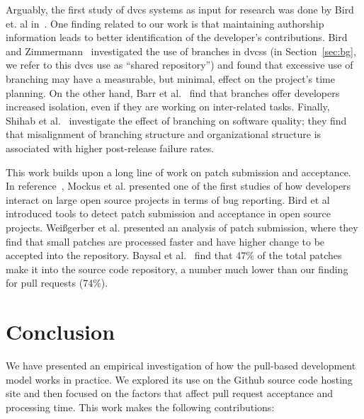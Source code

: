 \documentclass{acm_proc_article-sp}
\begin{document}
Arguably, the first study of {\sc dvcs} systems as input for research was done
by Bird et. al in~\cite{Bird09}. One finding related to our work is that
maintaining authorship information leads to better identification of the
developer's contributions. Bird and Zimmermann~\cite{Bird12} investigated the
use of branches in {\sc dvcs}s (in Section~\ref{sec:bg}, we refer to this {\sc
dvcs} use as ``shared repository'') and found that excessive use of branching
may have a measurable, but minimal, effect on the project's time planning.
On the other hand, Barr et al.~\cite{Barr12} find that branches offer developers
increased isolation, even if they are working on inter-related tasks.
Finally, Shihab et al.~\cite{Shiha12} investigate the effect of branching on
software quality; they find that misalignment of branching structure and organizational structure is associated with higher post-release failure rates.

This work builds upon a long line of work on patch submission and acceptance.
In reference~\cite{MOCKU02}, Mockus et al. presented one of the first studies of
how developers interact on large open source projects in terms of bug reporting.
Bird et al~\cite{Bird07a} introduced tools to detect patch submission and
acceptance in open source projects. Wei\ss gerber et al. presented an analysis
of patch submission, where they find that small patches are processed faster and
have higher change to be accepted into the repository. Baysal et
al.~\cite{Baysa12} find that 47\% of the total patches make it into the source
code repository, a number much lower than our finding for pull requests (74\%).

\section{Conclusion}

We have presented an empirical investigation of how the pull-based development
model works in practice. We explored its use on the Github source code
hosting site and then focused on the factors that affect pull request acceptance
and processing time. This work makes the following contributions:
\end{document}
